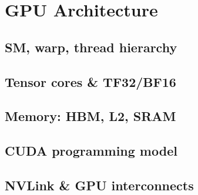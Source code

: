 
\section{GPU Architecture}

\subsection{SM, warp, thread hierarchy}


\subsection{Tensor cores \& TF32/BF16}


\subsection{Memory: HBM, L2, SRAM}


\subsection{CUDA programming model}


\subsection{NVLink \& GPU interconnects}


